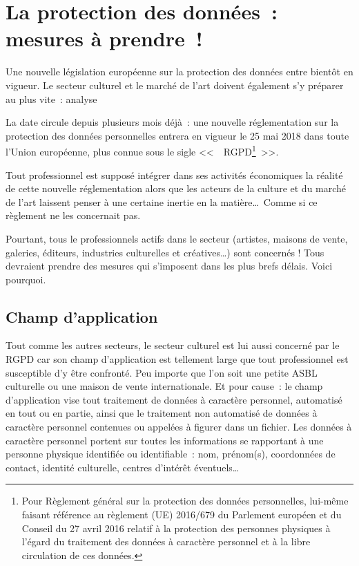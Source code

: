 \documentclass[11pt, french]{article}
\begin{document}
\vfill

\section{La protection des données~: mesures à prendre~!}

Une nouvelle législation européenne sur la protection des données
entre bientôt en vigueur. Le secteur culturel et le marché de l'art
doivent également s'y préparer au plus vite~: analyse

La date circule depuis plusieurs mois déjà~: une nouvelle
réglementation sur la protection des données personnelles entrera en
vigueur le 25 mai 2018 dans toute l'Union européenne, plus connue sous
le sigle <<~~RGPD\footnote{Pour Règlement général sur la protection des
  données personnelles, lui-même faisant référence au règlement (UE)
  2016/679 du Parlement européen et du Conseil du 27 avril 2016
  relatif à la protection des personnes physiques à l'égard du
  traitement des données à caractère personnel et à la libre
  circulation de ces données.}~>>.

Tout professionnel est supposé intégrer dans ses activités économiques
la réalité de cette nouvelle réglementation alors que les acteurs de
la culture et du marché de l'art laissent penser à une certaine
inertie en la matière\ldots\ Comme si ce règlement ne les concernait
pas.

Pourtant, tous le professionnels actifs dans le secteur (artistes,
maisons de vente, galeries, éditeurs, industries culturelles et
créatives\ldots) sont concernés ! Tous devraient prendre des mesures
qui s'imposent dans les plus brefs délais. Voici pourquoi.

\subsection{Champ d'application}

Tout comme les autres secteurs, le secteur culturel est lui aussi
concerné par le RGPD car son champ d'application est tellement large
que tout professionnel est susceptible d'y être confronté. Peu importe
que l'on soit une petite ASBL culturelle ou une maison de vente
internationale. Et pour cause~: le champ d'application vise tout
traitement de données à caractère personnel, automatisé en tout ou en
partie, ainsi que le traitement non automatisé de données à caractère
personnel contenues ou appelées à figurer dans un fichier. Les données
à caractère personnel portent sur toutes les informations se
rapportant à une personne physique identifiée ou identifiable~: nom,
prénom(s), coordonnées de contact, identité culturelle, centres
d'intérêt éventuels\ldots
\end{document}
